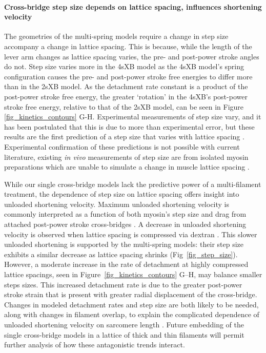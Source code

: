 \documentclass[10pt]{article}
\newcommand{\citep}[1]{\cite{#1}} %
\begin{document}
\paragraph{Cross-bridge step size depends on lattice spacing, influences shortening velocity} %
The geometries of the multi-spring models require a change in step size accompany a change in lattice spacing. 
This is because, while the length of the lever arm changes as lattice spacing varies, the pre- and post-power stroke angles do not. 
Step size varies more in the 4sXB model as the 4sXB model's spring configuration causes the pre- and post-power stroke free energies to differ more than in the 2sXB model. 
As the detachment rate constant is a product of the post-power stroke free energy, the greater `rotation' in the 4sXB's post-power stroke free energy, relative to that of the 2sXB model, can be seen in Figure \ref{fig_kinetics_contours} G-H. 
Experimental measurements of step size vary, and it has been postulated that this is due to more than experimental error, but these results are the first prediction of a step size that varies with lattice spacing \cite{Brenner2006}.
Experimental confirmation of these predictions is not possible with current literature, existing \textit{in vivo} measurements of step size are from isolated myosin preparations which are unable to simulate a change in muscle lattice spacing \citep{HowardBook, Peterman2004}. 

While our single cross-bridge models lack the predictive power of a multi-filament treatment, the dependence of step size on lattice spacing offers insight into unloaded shortening velocity. 
Maximum unloaded shortening velocity is commonly interpreted as a function of both myosin's step size and drag from attached post-power stroke cross-bridges \cite{Gordon2000}. 
A decrease in unloaded shortening velocity is observed when lattice spacing is compressed via dextran \cite{Goldman1987, Metzger1987}. 
This slower unloaded shortening is supported by the multi-spring models: their step size exhibits a similar decrease as lattice spacing shrinks (Fig~\ref{fig_step_size}). 
However, a moderate increase in the rate of detachment at highly compressed lattice spacings, seen in Figure~\ref{fig_kinetics_contours} G--H, may balance smaller steps sizes. 
This increased detachment rate is due to the greater post-power stroke strain that is present with greater radial displacement of the cross-bridge. 
Changes in modeled detachment rates and step size are both likely to be needed, along with changes in filament overlap, to explain the complicated dependence of unloaded shortening velocity on sarcomere length \cite{Edman1979}. 
Future embedding of the single cross-bridge models in a lattice of thick and thin filaments will permit further analysis of how these antagonistic trends interact. 
\end{document}
